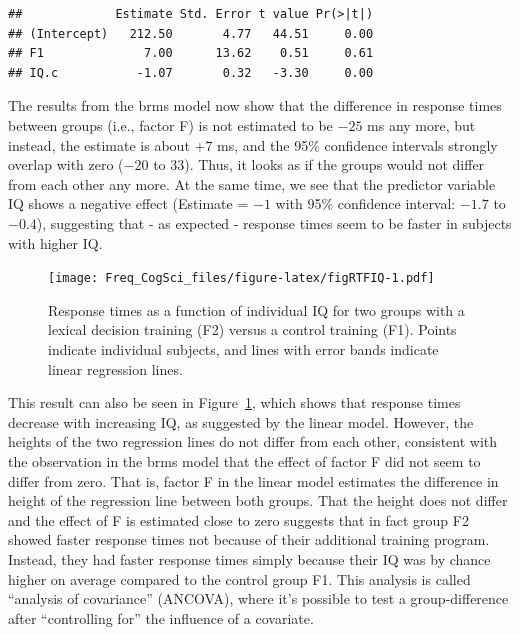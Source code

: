 \documentclass[
  12pt,
]{krantz}
\newenvironment{Shaded}{\begin{snugshade}}{\end{snugshade}}
\newcommand{\DecValTok}[1]{\textcolor[rgb]{0.00,0.00,0.81}{#1}}
\newcommand{\FunctionTok}[1]{\textcolor[rgb]{0.00,0.00,0.00}{#1}}
\newcommand{\NormalTok}[1]{#1}
\newcommand{\SpecialCharTok}[1]{\textcolor[rgb]{0.00,0.00,0.00}{#1}}
\theoremstyle{definition}
\theoremstyle{definition}
\theoremstyle{definition}
\theoremstyle{definition}
\theoremstyle{remark}
\begin{document}
\begin{Shaded}
\end{Shaded}

\begin{verbatim}
##             Estimate Std. Error t value Pr(>|t|)
## (Intercept)   212.50       4.77   44.51     0.00
## F1              7.00      13.62    0.51     0.61
## IQ.c           -1.07       0.32   -3.30     0.00
\end{verbatim}

The results from the brms model now show that the difference in response times between groups (i.e., factor F) is not estimated to be \(-25\) ms any more, but instead, the estimate is about \(+7\) ms, and the 95\% confidence intervals strongly overlap with zero (\(-20\) to \(33\)). Thus, it looks as if the groups would not differ from each other any more. At the same time, we see that the predictor variable IQ shows a negative effect (Estimate = \(-1\) with 95\% confidence interval: \(-1.7\) to \(-0.4\)), suggesting that - as expected - response times seem to be faster in subjects with higher IQ.

\begin{figure}
\centering
\texttt{[image: Freq\_CogSci\_files/figure-latex/figRTFIQ-1.pdf]}
\caption{\label{fig:figRTFIQ}Response times as a function of individual IQ for two groups with a lexical decision training (F2) versus a control training (F1). Points indicate individual subjects, and lines with error bands indicate linear regression lines.}
\end{figure}

This result can also be seen in Figure~\ref{fig:figRTFIQ}, which shows that response times decrease with increasing IQ, as suggested by the linear model. However, the heights of the two regression lines do not differ from each other, consistent with the observation in the brms model that the effect of factor F did not seem to differ from zero. That is, factor F in the linear model estimates the difference in height of the regression line between both groups.
That the height does not differ and the effect of F is estimated close to zero suggests that in fact group F2 showed faster response times not because of their additional training program. Instead, they had faster response times simply because their IQ was by chance higher on average compared to the control group F1. This analysis is called ``analysis of covariance'' (ANCOVA), where it's possible to test a group-difference after ``controlling for'' the influence of a covariate.
\end{document}
